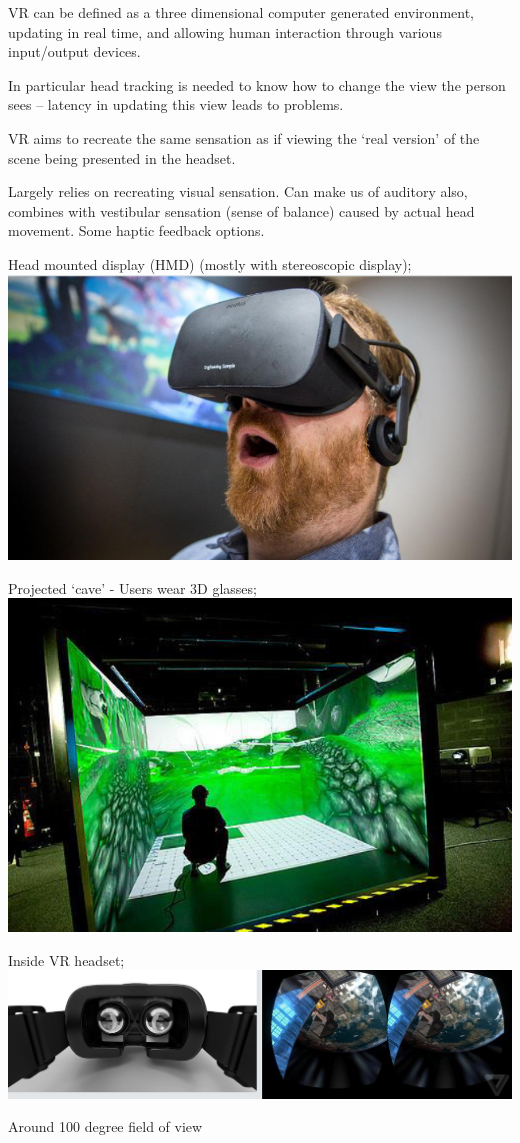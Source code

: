 \documentclass[]{project_plan}
\begin{document}
VR can be defined as a three dimensional
computer generated environment, updating
in real time, and allowing human interaction
through various input/output devices.

In particular head tracking is needed to know
how to change the view the person sees –
latency in updating this view leads to
problems.

VR aims to recreate the same sensation as if viewing the ‘real
version’ of the scene being presented in the headset.

Largely relies on recreating visual sensation.
Can make us of auditory also, combines with vestibular
sensation (sense of balance) caused by actual head movement.
Some haptic feedback options.

Head mounted display (HMD) (mostly with stereoscopic display);\\
\includegraphics[width=0.5\linewidth]{hmd.png}

\newpage

Projected ‘cave’ - Users wear 3D glasses;\\
\includegraphics[width=0.5\linewidth]{projected_cave_vr.png}

Inside VR headset;\\
\includegraphics[width=\linewidth]{inside_vr_headset.png}

Around 100 degree field of view
\end{document}
